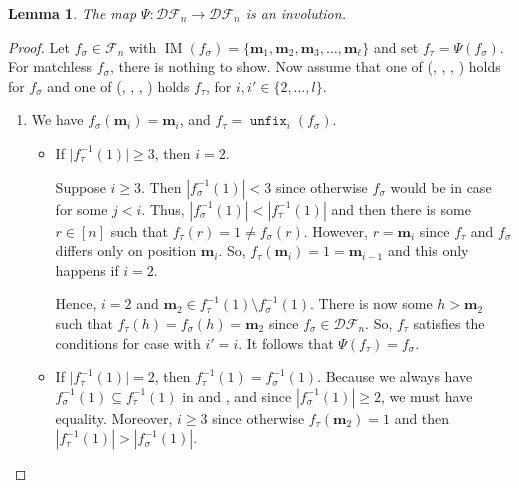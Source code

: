 \documentclass[reqno]{amsart}
\newtheorem{lemma}[theorem]{Lemma}
\theoremstyle{definition}
\newcommand{\SEF}{\mathcal{F}}  %
\newcommand{\DSEF}{\mathcal{DF}}%
\newcommand{\fretherD}{\Psi}
\newcommand{\img}{\mathbf{m}}
\DeclareMathOperator{\supp}{IM}
\DeclareMathOperator{\unfixMap}{\mathtt{unfix}}
\begin{document}
\begin{lemma}\label{lem:involution}
	The map $\fretherD:\DSEF_n\longrightarrow \DSEF_n$
	is an involution.
\end{lemma}
\begin{proof}
	Let $f_\sigma\in \SEF_n$ with $ \supp(f_{\sigma})=\{ \img_1, \img_2, \img_3, \dotsc, \img_{\ell} \}$ and set
	$f_\tau=\fretherD(f_\sigma)$. For matchless $f_\sigma$, there is nothing to show.
Now assume that one of (\caseOne[i], \caseTwo[i], \caseThree[i], \caseFour[i]) holds for $f_\sigma$ 
and one of (\caseOne[i'], \caseTwo[i'], \caseThree[i'], \caseFour[i']) holds $f_\tau$, for $i,i'\in\{2, \dotsc, l\}$.
	
\begin{enumerate}[leftmargin=1.6cm]
 	\item[\textbf{Case \caseOne[i]:}] 
 	  We have $f_\sigma(\img_i)=\img_i$, 
 	  and $f_\tau=\unfixMap_i(f_\sigma)$.
		
		\begin{itemize}[leftmargin=-1cm]
			\item
			If $\vert f_\tau^{-1}(1)\vert \geq 3$, then $i=2$.
			
			\medskip  
			Suppose $i\geq 3$. Then $|f_\sigma^{-1}(1)|<3$ since otherwise $f_\sigma$ would be in case \caseTwo[j] for some $j < i$.
			Thus,  $|f_\sigma^{-1}(1)| < |f_\tau^{-1}(1)|$ and then there is some $r\in [n]$ such that $f_\tau(r) = 1\neq f_\sigma(r)$. However, $r=\img_i$ since $f_\tau$ and $f_\sigma$ differs
			only on position $\img_i$. So, $f_\tau(\img_i)=1=\img_{i-1}$  and this only happens if $i=2$.
			
			\medskip 
			Hence, $i=2$ and  $\img_2\in f_\tau^{-1}(1)\setminus f_\sigma^{-1}(1)$. There is now some 
			$h>\img_2$ such that 
			$f_\tau(h)=f_\sigma(h)=
			\img_2$ since 
			$f_\sigma\in\DSEF_n$. 
			So, $f_\tau$ satisfies 
			the conditions for 
			case \caseTwo[i'] with $i'=i$. 
			It follows that $\fretherD(f_\tau)=f_\sigma$.
			
			
			
			\medskip
			
			\item If $\vert f_\tau^{-1}(1)\vert = 2$, then $f_\tau^{-1}(1)=f_\sigma^{-1}(1)$. Because  
			we always have $f_\sigma^{-1}(1)\subseteq f_\tau^{-1}(1)$ in 
			\caseOne[i] and \caseThree[i],
			and since $|f_\sigma^{-1}(1)| \geq 2$, we must have equality.
			Moreover, $i \geq 3$ since otherwise $f_\tau(\img_2)=1$ and then $|f_\tau^{-1}(1)|>|f_\sigma^{-1}(1)|$.
			

\end{itemize}
\end{enumerate}
\end{proof}
\end{document}
